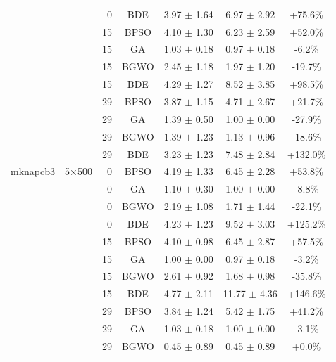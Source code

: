\begin{table}[htbp]
\begin{tabular}{llrcccc}
             &          & 0 & BDE   & 3.97 $\pm$ 1.64    & 6.97 $\pm$ 2.92    & +75.6\% \\
             &          & 15 & BPSO  & 4.10 $\pm$ 1.30    & 6.23 $\pm$ 2.59    & +52.0\% \\
             &          & 15 & GA    & 1.03 $\pm$ 0.18    & 0.97 $\pm$ 0.18    & -6.2\% \\
             &          & 15 & BGWO  & 2.45 $\pm$ 1.18    & 1.97 $\pm$ 1.20    & -19.7\% \\
             &          & 15 & BDE   & 4.29 $\pm$ 1.27    & 8.52 $\pm$ 3.85    & +98.5\% \\
             &          & 29 & BPSO  & 3.87 $\pm$ 1.15    & 4.71 $\pm$ 2.67    & +21.7\% \\
             &          & 29 & GA    & 1.39 $\pm$ 0.50    & 1.00 $\pm$ 0.00    & -27.9\% \\
             &          & 29 & BGWO  & 1.39 $\pm$ 1.23    & 1.13 $\pm$ 0.96    & -18.6\% \\
             &          & 29 & BDE   & 3.23 $\pm$ 1.23    & 7.48 $\pm$ 2.84    & +132.0\% \\
mknapcb3     & 5×500    & 0 & BPSO  & 4.19 $\pm$ 1.33    & 6.45 $\pm$ 2.28    & +53.8\% \\
             &          & 0 & GA    & 1.10 $\pm$ 0.30    & 1.00 $\pm$ 0.00    & -8.8\% \\
             &          & 0 & BGWO  & 2.19 $\pm$ 1.08    & 1.71 $\pm$ 1.44    & -22.1\% \\
             &          & 0 & BDE   & 4.23 $\pm$ 1.23    & 9.52 $\pm$ 3.03    & +125.2\% \\
             &          & 15 & BPSO  & 4.10 $\pm$ 0.98    & 6.45 $\pm$ 2.87    & +57.5\% \\
             &          & 15 & GA    & 1.00 $\pm$ 0.00    & 0.97 $\pm$ 0.18    & -3.2\% \\
             &          & 15 & BGWO  & 2.61 $\pm$ 0.92    & 1.68 $\pm$ 0.98    & -35.8\% \\
             &          & 15 & BDE   & 4.77 $\pm$ 2.11    & 11.77 $\pm$ 4.36   & +146.6\% \\
             &          & 29 & BPSO  & 3.84 $\pm$ 1.24    & 5.42 $\pm$ 1.75    & +41.2\% \\
             &          & 29 & GA    & 1.03 $\pm$ 0.18    & 1.00 $\pm$ 0.00    & -3.1\% \\
             &          & 29 & BGWO  & 0.45 $\pm$ 0.89    & 0.45 $\pm$ 0.89    & +0.0\% \\

\end{tabular}
\end{table}
